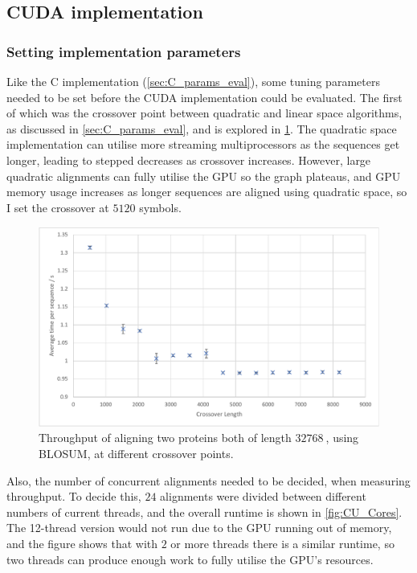 \subsection{CUDA implementation}
\label{sec:CUDA_eval}

\subsubsection{Setting implementation parameters}
\label{sec:CUDA_params_eval}

Like the C implementation (\cref{sec:C_params_eval}), some tuning parameters needed to be set before the CUDA implementation could be evaluated.
The first of which was the crossover point between quadratic and linear space algorithms, as discussed in \cref{sec:C_params_eval}, and is explored in \cref{fig:CU_Crossover}.
The quadratic space implementation can utilise more streaming multiprocessors as the sequences get longer, leading to stepped decreases as crossover increases.
However, large quadratic alignments can fully utilise the GPU so the graph plateaus, and GPU memory usage increases as longer sequences are aligned using quadratic space, so I set the crossover at $5120$ symbols.

\begin{figure}
    \centering
    \includegraphics[width=\textwidth]{figs/eval/cu_crossover.pdf}
    \caption{Throughput of aligning two proteins both of length $\SI{32768}{}$, using BLOSUM, at different crossover points.}
    \label{fig:CU_Crossover}
\end{figure}

Also, the number of concurrent alignments needed to be decided, when measuring throughput.
To decide this, $24$ alignments were divided between different numbers of current threads, and the overall runtime is shown in \cref{fig:CU_Cores}.
The 12-thread version would not run due to the GPU running out of memory, and the figure shows that with $2$ or more threads there is a similar runtime, so two threads can produce enough work to fully utilise the GPU's resources.


